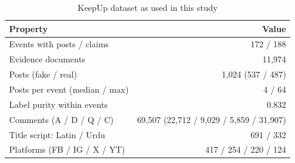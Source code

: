 \begin{table}[t]
\centering
\caption{KeepUp dataset as used in this study}
\label{tab:data}
\footnotesize
\begin{tabular}{lr}
\toprule
Property & Value\\
\midrule
Events with posts / claims & 172 / 188\\
Evidence documents & 11,974\\
Posts (fake / real) & 1,024 (537 / 487)\\
Posts per event (median / max) & 4 / 64\\
Label purity within events & 0.832\\
Comments (A / D / Q / C) & 69,507 (22,712 / 9,029 / 5,859 / 31,907)\\
Title script: Latin / Urdu & 691 / 332\\
Platforms (FB / IG / X / YT) & 417 / 254 / 220 / 124\\
\bottomrule
\end{tabular}
\end{table}
